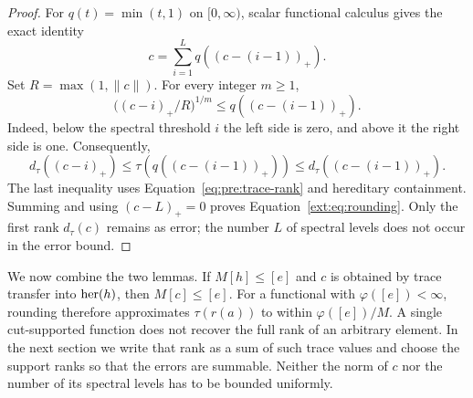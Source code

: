 \begin{proof}
For $q(t)=\min(t,1)$ on $[0,\infty)$, scalar functional calculus
gives the exact identity
\begin{equation}
\label{ext:eq:staircase}
 c=\sum_{i=1}^L q((c-(i-1))_+).
\end{equation}
Set $R=\max(1,\|c\|)$. For every integer $m\ge1$,
\[
 \big((c-i)_+/R\big)^{1/m}\le q((c-(i-1))_+).
\]
Indeed, below the spectral threshold $i$ the left side is zero,
and above it the right side is one. Consequently,
\[
 d_\tau((c-i)_+)
 \le\tau(q((c-(i-1))_+))
 \le d_\tau((c-(i-1))_+).
\]
The last inequality uses Equation~\eqref{eq:pre:trace-rank} and
hereditary containment. Summing and using $(c-L)_+=0$ proves
Equation~\eqref{ext:eq:rounding}. Only the first rank $d_\tau(c)$
remains as error; the number $L$ of spectral levels does not occur
in the error bound.
\end{proof}

We now combine the two lemmas. If $M[h]\le[e]$ and $c$ is obtained
by trace transfer into $\operatorname{her}(h)$, then $M[c]\le[e]$.
For a functional with $\varphi([e])<\infty$, rounding therefore
approximates $\tau(r(a))$ to within $\varphi([e])/M$.
A single cut-supported function does not recover the full rank of an
arbitrary element. In the next section we write that rank as a sum of
such trace values and choose the support ranks so that the errors are
summable. Neither the norm of $c$ nor the number of its spectral levels
has to be bounded uniformly.
